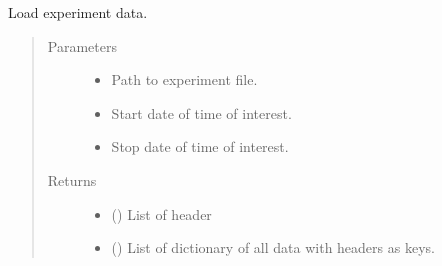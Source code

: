 \documentclass[letterpaper,10pt,english]{sphinxmanual}
\begin{document}
\begin{fulllineitems}
\label{\detokenize{NoSeMazeController/Analysis:Analysis.Performance.load_data}}
\pysigstartsignatures
{}
\pysigstopsignatures
\sphinxAtStartPar
Load experiment data.
\begin{quote}\begin{description}
\item[{Parameters}] \leavevmode\begin{itemize}
\item {} 
\sphinxAtStartPar
{} \textendash{} Path to experiment file.

\item {} 
\sphinxAtStartPar
{} \textendash{} Start date of time of interest.

\item {} 
\sphinxAtStartPar
{} \textendash{} Stop date of time of interest.

\end{itemize}

\item[{Returns}] \leavevmode
\sphinxAtStartPar
\begin{itemize}
\item {} 
\sphinxAtStartPar
{} () \textendash{} List of header

\item {} 
\sphinxAtStartPar
{} () \textendash{} List of dictionary of all data with headers as keys.

\end{itemize}


\end{description}\end{quote}

\end{fulllineitems}
\end{document}
